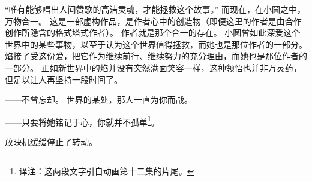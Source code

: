 “唯有能够唱出人间赞歌的高洁灵魂，才能拯救这个故事。”
而现在，在小圆之中，万物合一。
这是一部虚构作品，是作者心中的创造物（即便这里的作者是由合作创作所隐含的格式塔式作者）。
作者就是那个合一的存在。
小圆曾如此深爱这个世界中的某些事物，以至于认为这个世界值得拯救，而她也是那位作者的一部分。
焰接了受这份爱，把它作为继续前行、继续努力的充分理由，而她也是那位作者的一部分。
正如新世界中的焰并没有突然满面笑容一样，这种领悟也并非万灵药，但足以让人再坚持一段时间了。

——不曾忘却。
世界的某处，那人一直为你而战。

——只要将她铭记于心，你就并不孤单\footnote{%
    译注：这两段文字引自动画第十二集的片尾。
}。

放映机缓缓停止了转动。
